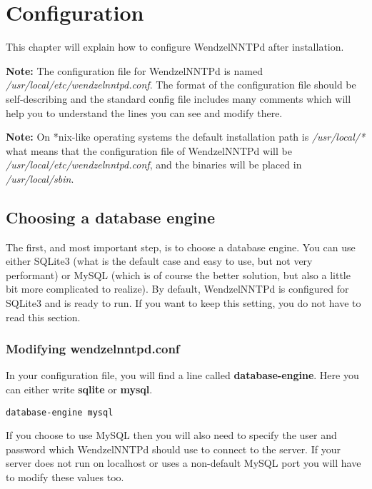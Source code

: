 \chapter{Configuration}

This chapter will explain how to configure WendzelNNTPd after installation.

{\bf Note:} The configuration file for WendzelNNTPd is named {\it /usr/local/etc/wendzelnntpd.conf}. The format of the configuration file should be self-describing and the standard config file includes many comments which will help you to understand the lines you can see and modify there.

{\bf Note:} On *nix-like operating systems the default installation path is {\it /usr/local/*} what means that the configuration file of WendzelNNTPd will be {\it /usr/local/etc/wendzelnntpd.conf}, and the binaries will be placed in {\it /usr/local/sbin}. %

\section{Choosing a database engine}

The first, and most important step, is to choose a database engine. You can use either SQLite3 (what is the default case and easy to use, but not very performant) or MySQL (which is of course the better solution, but also a little bit more complicated to realize). By default, WendzelNNTPd is configured for SQLite3 and is ready to run. If you want to keep this setting, you do not have to read this section.

\subsection{Modifying wendzelnntpd.conf}

In your configuration file, you will find a line called {\bf database-engine}. Here you can either write {\bf sqlite} or {\bf mysql}.

\begin{verbatim}
database-engine mysql
\end{verbatim}

If you choose to use MySQL then you will also need to specify the user and password which WendzelNNTPd should use to connect to the server. If your server does not run on localhost or uses a non-default MySQL port you will have to modify these values too.

